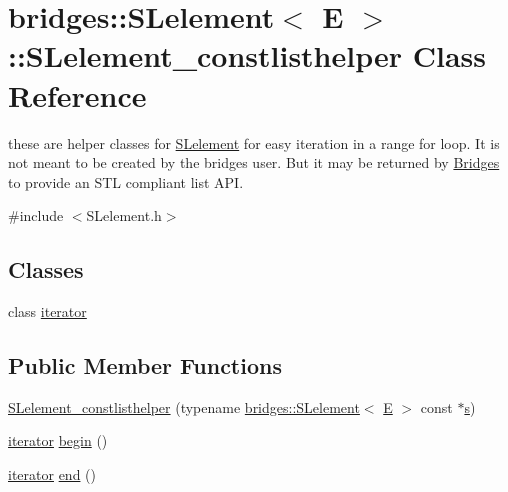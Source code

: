 \hypertarget{classbridges_1_1_s_lelement_1_1_s_lelement__constlisthelper}{}\section{bridges\+:\+:S\+Lelement$<$ E $>$\+:\+:S\+Lelement\+\_\+constlisthelper Class Reference}
\label{classbridges_1_1_s_lelement_1_1_s_lelement__constlisthelper}


these are helper classes for \hyperlink{classbridges_1_1_s_lelement}{S\+Lelement} for easy iteration in a range for loop. It is not meant to be created by the bridges user. But it may be returned by \hyperlink{classbridges_1_1_bridges}{Bridges} to provide an S\+TL compliant list A\+PI.  




{\ttfamily \#include $<$S\+Lelement.\+h$>$}

\subsection*{Classes}
\begin{DoxyCompactItemize}
\item 
class \hyperlink{classbridges_1_1_s_lelement_1_1_s_lelement__constlisthelper_1_1iterator}{iterator}
\end{DoxyCompactItemize}
\subsection*{Public Member Functions}
\begin{DoxyCompactItemize}
\item 
\hyperlink{classbridges_1_1_s_lelement_1_1_s_lelement__constlisthelper_ab5a8cde7ff6fa03210116f9e170b1dbf}{S\+Lelement\+\_\+constlisthelper} (typename \hyperlink{classbridges_1_1_s_lelement}{bridges\+::\+S\+Lelement}$<$ \hyperlink{namespacebridges_acfb0a4f7877d8f63de3e6862004c50eda3a3ea00cfc35332cedf6e5e9a32e94da}{E} $>$ const $\ast$\hyperlink{namespacebridges_acfb0a4f7877d8f63de3e6862004c50eda03c7c0ace395d80182db07ae2c30f034}{s})
\item 
\hyperlink{classbridges_1_1_s_lelement_1_1_s_lelement__constlisthelper_1_1iterator}{iterator} \hyperlink{classbridges_1_1_s_lelement_1_1_s_lelement__constlisthelper_a8e249ed544f62a325b0e5b047519b70e}{begin} ()
\item 
\hyperlink{classbridges_1_1_s_lelement_1_1_s_lelement__constlisthelper_1_1iterator}{iterator} \hyperlink{classbridges_1_1_s_lelement_1_1_s_lelement__constlisthelper_a55dafccf3d35b8746b2de761c2309cef}{end} ()
\end{DoxyCompactItemize}


